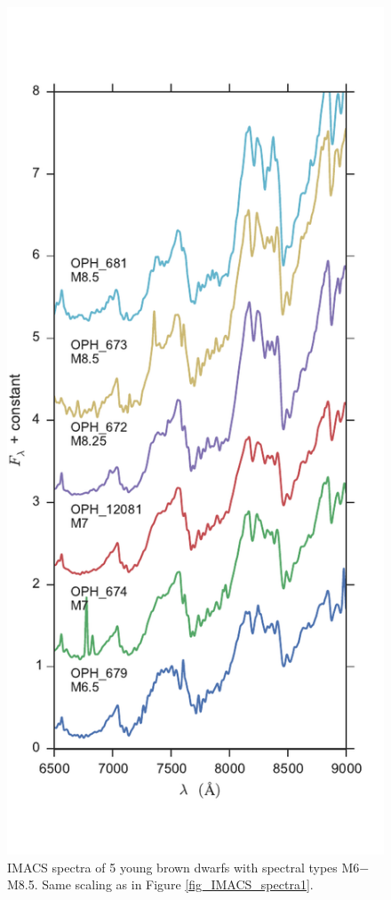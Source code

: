 \begin{figure}[ht!]
\caption[IMACS spectra of 5 young brown dwarfs with spectral types M6$-$M8.5]{IMACS spectra of 5 young brown dwarfs with spectral types M6$-$M8.5.  Same scaling as in Figure \ref{fig_IMACS_spectra1}. \label{fig_IMACS_spectra2} }
\centering
\includegraphics[scale=0.65]{chIMACS/figures/IMACS_spectra_M6_M8p5}
\end{figure}

